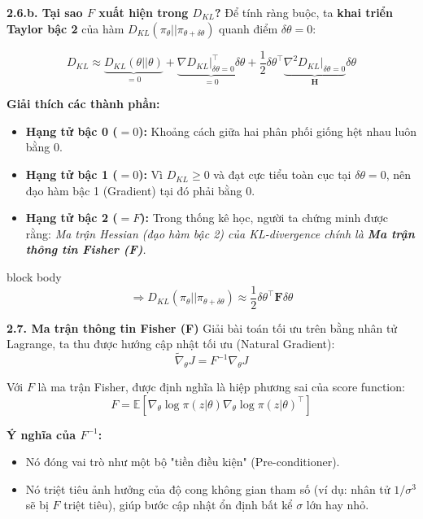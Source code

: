 \documentclass[10pt,xcolor=dvipsnames]{beamer}
\newcommand{\E}{\mathbb{E}}
\begin{document}
\begin{frame}{\textbf{2.6.b. 	Tại sao $F$ xuất hiện trong $D_{KL}$?}}
	Để tính ràng buộc, ta \textbf{khai triển Taylor bậc 2} của hàm $D_{KL}(\pi_\theta || \pi_{\theta+\delta\theta})$ quanh điểm $\delta\theta = 0$:
	
	\begin{equation}
		D_{KL} \approx \underbrace{D_{KL}(\theta||\theta)}_{=0} + \underbrace{\nabla D_{KL}\big|_{\delta\theta=0}^\top \delta\theta}_{=0} + \frac{1}{2} \delta\theta^\top \underbrace{\nabla^2 D_{KL}\big|_{\delta\theta=0}}_{\mathbf{H}} \delta\theta
	\end{equation}
	
	\textbf{Giải thích các thành phần:}
	\begin{itemize}
		\item \textbf{Hạng tử bậc 0 ($=0$):} Khoảng cách giữa hai phân phối giống hệt nhau luôn bằng 0.
		\item \textbf{Hạng tử bậc 1 ($=0$):} Vì $D_{KL} \ge 0$ và đạt cực tiểu toàn cục tại $\delta\theta=0$, nên đạo hàm bậc 1 (Gradient) tại đó phải bằng 0.
		\item \textbf{Hạng tử bậc 2 ($=F$):} Trong thống kê học, người ta chứng minh được rằng: \textit{Ma trận Hessian (đạo hàm bậc 2) của KL-divergence chính là \textbf{Ma trận thông tin Fisher (F)}.}
	\end{itemize}
	
	\begin{beamercolorbox}[sep=8pt,center,shadow=true,rounded=true]{block body}
		\[ \Rightarrow D_{KL}(\pi_\theta || \pi_{\theta+\delta\theta}) \approx \frac{1}{2} \delta\theta^\top \mathbf{F} \delta\theta \]
	\end{beamercolorbox}
\end{frame}

\begin{frame}{\textbf{2.7. Ma trận thông tin Fisher (F)}}
	Giải bài toán tối ưu trên bằng nhân tử Lagrange, ta thu được hướng cập nhật tối ưu (Natural Gradient):
	\begin{equation}
		\tilde{\nabla}_\theta J = F^{-1} \nabla_\theta J
	\end{equation}
	
	Với $F$ là ma trận Fisher, được định nghĩa là hiệp phương sai của score function:
	\begin{equation}
		F = \E \left[ \nabla_\theta \log \pi(z|\theta) \nabla_\theta \log \pi(z|\theta)^\top \right]
	\end{equation}
	
	\textbf{Ý nghĩa của $F^{-1}$:}
	\begin{itemize}
		\item Nó đóng vai trò như một bộ "tiền điều kiện" (Pre-conditioner).
		\item Nó triệt tiêu ảnh hưởng của độ cong không gian tham số (ví dụ: nhân tử $1/\sigma^3$ sẽ bị $F$ triệt tiêu), giúp bước cập nhật ổn định bất kể $\sigma$ lớn hay nhỏ.
	\end{itemize}
\end{frame}
\end{document}
